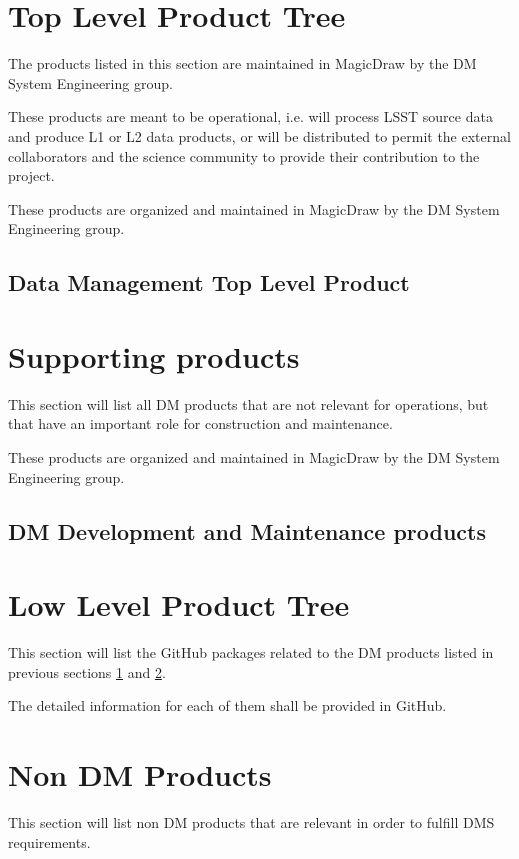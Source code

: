 \newpage
\section{Top Level Product Tree}\label{sec:top}

The products listed in this section are maintained in MagicDraw by the DM System Engineering group. 

These products are meant to be operational, i.e. will process LSST source data and produce L1 or L2 data products, or will be distributed to permit the external collaborators and the science community to provide their contribution to the project.

These products are organized and maintained in MagicDraw by the DM System Engineering group.

\newpage
\subsection{Data Management Top Level Product}\label{sec:dmtop}




\newpage
\section{Supporting products}\label{sec:sups}

This section will list all DM products that are not relevant for operations, but that have an important role for construction and maintenance.

These products are organized and maintained in MagicDraw by the DM System Engineering group.
\newpage
\subsection{DM Development and Maintenance products}



\newpage
\section{Low Level Product Tree}\label{sec:low}

This section will list the GitHub packages related to the DM products listed in previous sections \ref{sec:top} and \ref{sec:sups}.

The detailed information for each of them shall be provided in GitHub.

%


\newpage
\section{Non DM Products}\label{sec:nondm}

This section will list non DM products that are relevant in order to fulfill DMS requirements.
